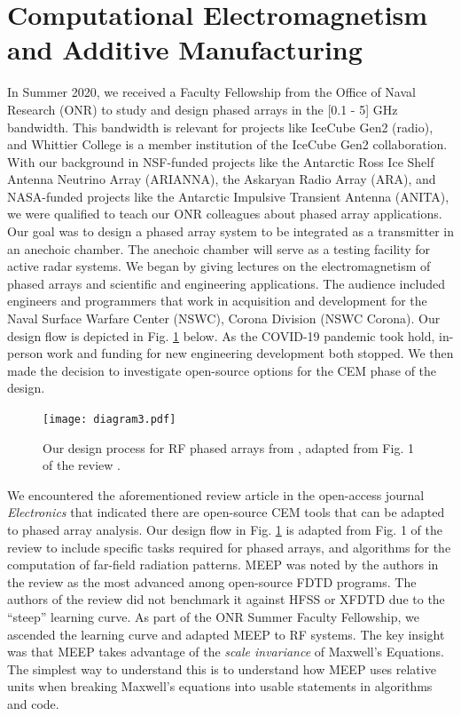 \documentclass[../../main.tex]{subfiles}
\begin{document}
\section{Computational Electromagnetism and Additive Manufacturing}
\label{sec:cem}

In Summer 2020, we received a Faculty Fellowship from the Office of Naval Research (ONR) to study and design phased arrays in the [0.1 - 5] GHz bandwidth.  This bandwidth is relevant for projects like IceCube Gen2 (radio), and Whittier College is a member institution of the IceCube Gen2 collaboration.  With our background in NSF-funded projects like the Antarctic Ross Ice Shelf Antenna Neutrino Array (ARIANNA), the Askaryan Radio Array (ARA), and NASA-funded projects like the Antarctic Impulsive Transient Antenna (ANITA), we were qualified to teach our ONR colleagues about phased array applications.  Our goal was to design a phased array system to be integrated as a transmitter in an anechoic chamber.  The anechoic chamber will serve as a testing facility for active radar systems.  We began by giving lectures on the electromagnetism of phased arrays and scientific and engineering applications.  The audience included engineers and programmers that work in acquisition and development for the Naval Surface Warfare Center (NSWC), Corona Division (NSWC Corona).  Our design flow is depicted in Fig. \ref{fig:design} below.  As the COVID-19 pandemic took hold, in-person work and funding for new engineering development both stopped.  We then made the decision to investigate open-source options for the CEM phase of the design. \\ \vspace{2.5mm}

\begin{figure}
\centering
\texttt{[image: diagram3.pdf]}
\caption{\label{fig:design}  Our design process for RF phased arrays from \cite{electronics10040415}, adapted from Fig. 1 of the review \cite{10.3390/electronics8121506}.}
\end{figure}

We encountered the aforementioned review article in the open-access journal \textit{Electronics} that indicated there are open-source CEM tools that can be adapted to phased array analysis.  Our design flow in Fig. \ref{fig:design} is adapted from Fig. 1 of the review to include specific tasks required for phased arrays, and algorithms for the computation of far-field radiation patterns.  MEEP was noted by the authors in the review as the most advanced among open-source FDTD programs.  The authors of the review did not benchmark it against HFSS or XFDTD due to the ``steep'' learning curve.  As part of the ONR Summer Faculty Fellowship, we ascended the learning curve and adapted MEEP to RF systems.  The key insight was that MEEP takes advantage of the \textit{scale invariance} of Maxwell's Equations.  The simplest way to understand this is to understand how MEEP uses relative units when breaking Maxwell's equations into usable statements in algorithms and code. \\ \vspace{2.5mm}
\end{document}
